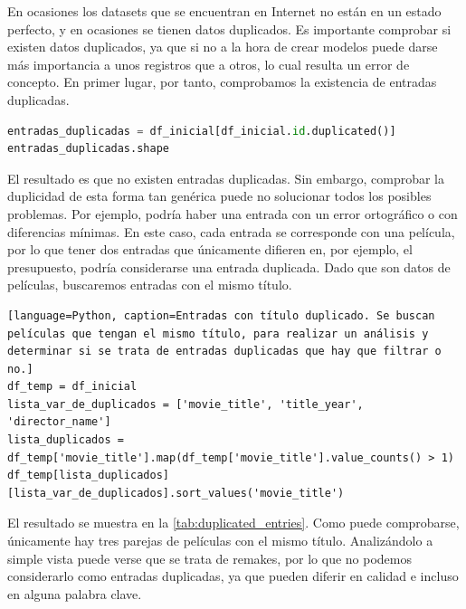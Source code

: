En ocasiones los datasets que se encuentran en Internet no están en un estado perfecto, y en ocasiones se tienen datos duplicados. Es importante comprobar si existen datos duplicados, ya que si no a la hora de crear modelos puede darse más importancia a unos registros que a otros, lo cual resulta un error de concepto. En primer lugar, por tanto, comprobamos la existencia de entradas duplicadas.
\begin{lstlisting}[language=Python, caption=Entradas duplicadas. Se buscan entradas duplicadas a partir del id de la película y se devuelve la cantidad de películas repetidas.]
entradas_duplicadas = df_inicial[df_inicial.id.duplicated()]
entradas_duplicadas.shape
\end{lstlisting}
El resultado es que no existen entradas duplicadas. Sin embargo, comprobar la duplicidad de esta forma tan genérica puede no solucionar todos los posibles problemas. Por ejemplo, podría haber una entrada con un error ortográfico o con diferencias mínimas. En este caso, cada entrada se corresponde con una película, por lo que tener dos entradas que únicamente difieren en, por ejemplo, el presupuesto, podría considerarse una entrada duplicada. Dado que son datos de películas, buscaremos entradas con el mismo título. 

\begin{lstlisting}[language=Python, caption=Entradas con título duplicado. Se buscan películas que tengan el mismo título, para realizar un análisis y determinar si se trata de entradas duplicadas que hay que filtrar o no.]
df_temp = df_inicial
lista_var_de_duplicados = ['movie_title', 'title_year', 'director_name']
lista_duplicados = df_temp['movie_title'].map(df_temp['movie_title'].value_counts() > 1)
df_temp[lista_duplicados][lista_var_de_duplicados].sort_values('movie_title')
\end{lstlisting}

El resultado se muestra en la \autoref{tab:duplicated_entries}. Como puede comprobarse, únicamente hay tres parejas de películas con el mismo título. Analizándolo a simple vista puede verse que se trata de remakes, por lo que no podemos considerarlo como entradas duplicadas, ya que pueden diferir en calidad e incluso en alguna palabra clave.\\

